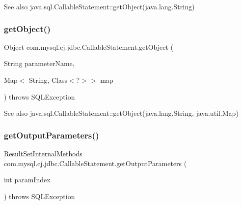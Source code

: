 \begin{DoxySeeAlso}{See also}
java.\+sql.\+Callable\+Statement\+::get\+Object(java.\+lang.\+String) 
\end{DoxySeeAlso}
\mbox{\label{classcom_1_1mysql_1_1cj_1_1jdbc_1_1_callable_statement_a367ba176bf87e7f1ec648719163ccfe1}} 
\subsubsection{\texorpdfstring{get\+Object()}{getObject()}\hspace{0.1cm}{\footnotesize\ttfamily [4/4]}}
{\footnotesize\ttfamily Object com.\+mysql.\+cj.\+jdbc.\+Callable\+Statement.\+get\+Object (\begin{DoxyParamCaption}\item[{String}]{parameter\+Name,  }\item[{Map$<$ String, Class$<$?$>$$>$}]{map }\end{DoxyParamCaption}) throws S\+Q\+L\+Exception}

\begin{DoxySeeAlso}{See also}
java.\+sql.\+Callable\+Statement\+::get\+Object(java.\+lang.\+String, java.\+util.\+Map) 
\end{DoxySeeAlso}
\mbox{\label{classcom_1_1mysql_1_1cj_1_1jdbc_1_1_callable_statement_af73a9e62e30b97e9b02f519a09749fbf}} 
\subsubsection{\texorpdfstring{get\+Output\+Parameters()}{getOutputParameters()}}
{\footnotesize\ttfamily \mbox{\hyperlink{interfacecom_1_1mysql_1_1cj_1_1jdbc_1_1result_1_1_result_set_internal_methods}{Result\+Set\+Internal\+Methods}} com.\+mysql.\+cj.\+jdbc.\+Callable\+Statement.\+get\+Output\+Parameters (\begin{DoxyParamCaption}\item[{int}]{param\+Index }\end{DoxyParamCaption}) throws S\+Q\+L\+Exception\hspace{0.3cm}{\ttfamily [protected]}}

